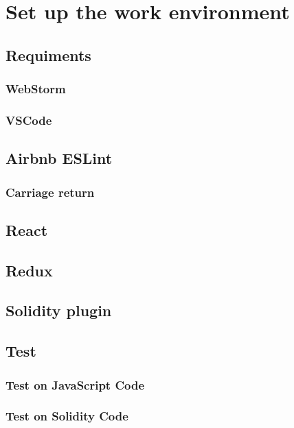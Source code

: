 \documentclass[ManualeSviluppatore.tex]{subfiles}
\begin{document}
\chapter{Set up the work environment}
\section{Requiments}
\subsection{WebStorm}
\subsection{VSCode}
\section{Airbnb ESLint}
\subsection{Carriage return}
\section{React}
\section{Redux}
\section{Solidity plugin}
\section{Test}
\subsection{Test on JavaScript Code}
\subsection{Test on Solidity Code}
\end{document}
